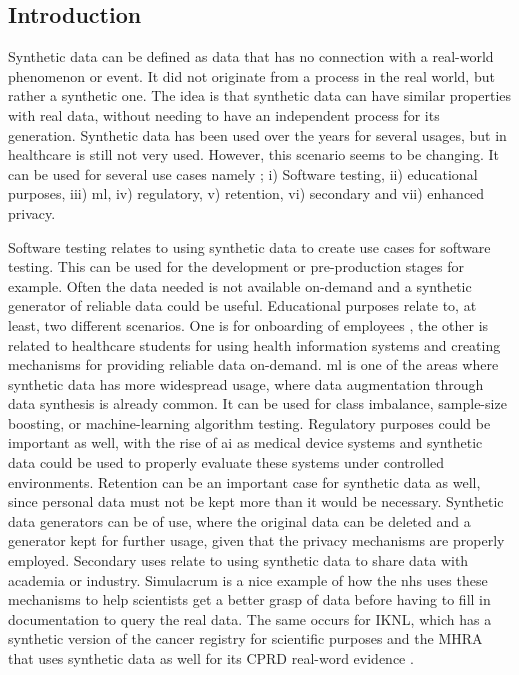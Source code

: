 
\subsection{Introduction}
Synthetic data can be defined as data that has no connection with a real-world phenomenon or event. It did not originate from a process in the real world, but rather a synthetic one. The idea is that synthetic data can have similar properties with real data, without needing to have an independent process for its generation.
Synthetic data has been used over the years for several usages, but in healthcare is still not very used. However, this scenario seems to be changing. It can be used for several use cases namely \cite{synthetic-data-usage}; i) Software testing, ii) educational purposes, iii) \ac{ml}, iv) regulatory, v) retention, vi) secondary and vii) enhanced privacy.

Software testing relates to using synthetic data to create use cases for software testing. This can be used for the development or pre-production stages for example. Often the data needed is not available on-demand and a synthetic generator of reliable data could be useful. Educational purposes relate to, at least, two different scenarios. One is for onboarding of employees \cite{synthetic-data-usage}, the other is related to healthcare students for using health information systems and creating mechanisms for providing reliable data on-demand.
\ac{ml} is one of the areas where synthetic data has more widespread usage, where data augmentation through data synthesis is already common. It can be used for class imbalance, sample-size boosting, or machine-learning algorithm testing. Regulatory purposes could be important as well, with the rise of \ac{ai} as medical device systems and synthetic data could be used to properly evaluate these systems under controlled environments. Retention can be an important case for synthetic data as well, since personal data must not be kept more than it would be necessary. Synthetic data generators can be of use, where the original data can be deleted and a generator kept for further usage, given that the privacy mechanisms are properly employed. Secondary uses relate to using synthetic data to share data with academia or industry. Simulacrum \cite{simulacrum} is a nice example of how the \ac{nhs} uses these mechanisms to help scientists get a better grasp of data before having to fill in documentation to query the real data. The same occurs for \ac{IKNL}, which has a synthetic version of the cancer registry for scientific purposes \cite{synthetic_2} and the \ac{MHRA} that uses synthetic data as well for its CPRD real-word evidence \cite{mhra_cprd}.

